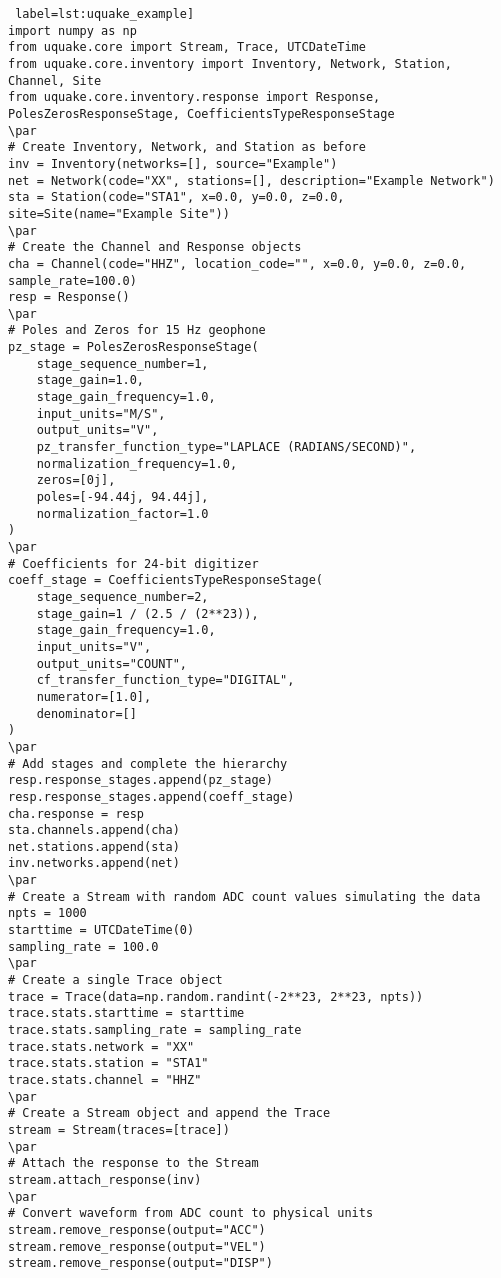 \documentclass[12pt]{article}
\def\lthtmlcheckvsize{\ifdim\ht\sizebox<\vsize 
  \ifdim\wd\sizebox<\hsize\expandafter\hfill\fi \expandafter\vfill
  \else\expandafter\vss\fi}%
\begin{document}
{\newpage\clearpage
{}%
\begin{verbatim} label=lst:uquake_example]
import numpy as np
from uquake.core import Stream, Trace, UTCDateTime
from uquake.core.inventory import Inventory, Network, Station, Channel, Site
from uquake.core.inventory.response import Response, PolesZerosResponseStage, CoefficientsTypeResponseStage
\par
# Create Inventory, Network, and Station as before
inv = Inventory(networks=[], source="Example")
net = Network(code="XX", stations=[], description="Example Network")
sta = Station(code="STA1", x=0.0, y=0.0, z=0.0, site=Site(name="Example Site"))
\par
# Create the Channel and Response objects
cha = Channel(code="HHZ", location_code="", x=0.0, y=0.0, z=0.0, sample_rate=100.0)
resp = Response()
\par
# Poles and Zeros for 15 Hz geophone
pz_stage = PolesZerosResponseStage(
    stage_sequence_number=1,
    stage_gain=1.0,
    stage_gain_frequency=1.0,
    input_units="M/S",
    output_units="V",
    pz_transfer_function_type="LAPLACE (RADIANS/SECOND)",
    normalization_frequency=1.0,
    zeros=[0j],
    poles=[-94.44j, 94.44j],
    normalization_factor=1.0
)
\par
# Coefficients for 24-bit digitizer
coeff_stage = CoefficientsTypeResponseStage(
    stage_sequence_number=2,
    stage_gain=1 / (2.5 / (2**23)),
    stage_gain_frequency=1.0,
    input_units="V",
    output_units="COUNT",
    cf_transfer_function_type="DIGITAL",
    numerator=[1.0],
    denominator=[]
)
\par
# Add stages and complete the hierarchy
resp.response_stages.append(pz_stage)
resp.response_stages.append(coeff_stage)
cha.response = resp
sta.channels.append(cha)
net.stations.append(sta)
inv.networks.append(net)
\par
# Create a Stream with random ADC count values simulating the data
npts = 1000
starttime = UTCDateTime(0)
sampling_rate = 100.0
\par
# Create a single Trace object
trace = Trace(data=np.random.randint(-2**23, 2**23, npts))
trace.stats.starttime = starttime
trace.stats.sampling_rate = sampling_rate
trace.stats.network = "XX"
trace.stats.station = "STA1"
trace.stats.channel = "HHZ"
\par
# Create a Stream object and append the Trace
stream = Stream(traces=[trace])
\par
# Attach the response to the Stream
stream.attach_response(inv)
\par
# Convert waveform from ADC count to physical units
stream.remove_response(output="ACC")
stream.remove_response(output="VEL")
stream.remove_response(output="DISP")
\end{verbatim}%
\lthtmlfigureZ
\lthtmlcheckvsize\clearpage}
\end{document}
